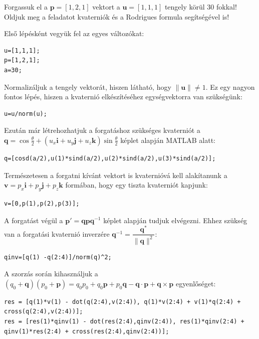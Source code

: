 \begin{execise}
	Forgassuk el a $\mathbf{p}=\left[1,2,1\right]$ vektort a $\mathbf{u}=\left[1,1,1\right]$ tengely körül 30 fokkal! Oldjuk meg a feladatot kvaterniók és a Rodrigues formula segítségével is!
\end{execise}
\begin{answer}
	Első lépésként vegyük fel az egyes változókat:
\begin{lstlisting}
u=[1,1,1];
p=[1,2,1];
a=30;
\end{lstlisting}

Normalizáljuk a tengely vektorát, hiszen látható, hogy $\|\mathbf{u}\|\neq 1$. Ez egy nagyon fontos lépés, hiszen a kvaternió elkészítéséhez egységvektorra van szükségünk:	
\begin{lstlisting}
u=u/norm(u);
\end{lstlisting}	

Ezután már létrehozhatjuk a forgatáshoz szükséges kvaterniót a $\mathbf{q} = \cos \frac{\theta}{2} + (u_x\mathbf{i} + u_y\mathbf{j} + u_z\mathbf{k}) \sin \frac{\theta}{2}$ képlet alapján MATLAB alatt:	
\begin{lstlisting}
q=[cosd(a/2),u(1)*sind(a/2),u(2)*sind(a/2),u(3)*sind(a/2)];
\end{lstlisting}

Természetesen a forgatni kívánt vektort is kvaternióvá kell alakítanunk a $\mathbf{v} = p_x\mathbf{i} + p_y\mathbf{j} + p_z\mathbf{k}$ formában, hogy egy tiszta kvaterniót kapjunk:
\begin{lstlisting}
v=[0,p(1),p(2),p(3)];
\end{lstlisting}

A forgatást végül a $\mathbf{p'} = \mathbf{q} \mathbf{p} \mathbf{q}^{-1}$ képlet alapján tudjuk elvégezni. Ehhez szükség van a forgatási kvaternió inverzére $\mathbf{q}^{-1}=\dfrac{\mathbf{q}^*}{\|\mathbf{q}\|^2}$:
\begin{lstlisting}
qinv=[q(1) -q(2:4)]/norm(q)^2;
\end{lstlisting}

A szorzás során kihasználjuk a $(q_0 + \mathbf{q})(p_0 + \mathbf{p})=q_0 p_0 + q_0 \mathbf{p} + p_0 \mathbf{q} - \mathbf{q}\cdot\mathbf{p} + \mathbf{q} \times \mathbf{p}$ egyenlőséget:
\begin{lstlisting}
res = [q(1)*v(1) - dot(q(2:4),v(2:4)), q(1)*v(2:4) + v(1)*q(2:4) + cross(q(2:4),v(2:4))];
res = [res(1)*qinv(1) - dot(res(2:4),qinv(2:4)), res(1)*qinv(2:4) + qinv(1)*res(2:4) + cross(res(2:4),qinv(2:4))];
\end{lstlisting}


\end{answer}
